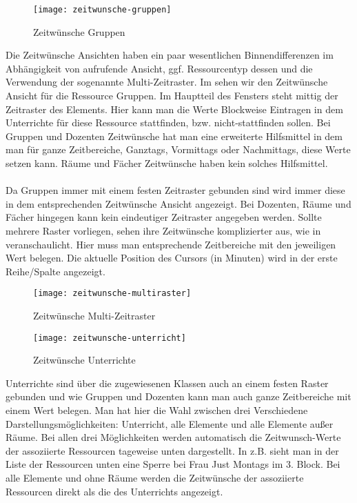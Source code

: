 \newpage

\begin{wrapfigure}{r}{0.3\textwidth}
	\texttt{[image: zeitwunsche-gruppen]}
	\vspace{-15pt}
	\caption{Zeitwünsche Gruppen}
	\label{fig:zeitwunsche-gruppen}
\end{wrapfigure}

\noindent
Die Zeitwünsche Ansichten haben ein paar wesentlichen Binnendifferenzen im Abhängigkeit von aufrufende Ansicht, ggf. Ressourcentyp dessen und die Verwendung der sogenannte Multi-Zeitraster. Im  sehen wir den Zeitwünsche Ansicht für die Ressource Gruppen. Im Hauptteil des Fensters steht mittig der Zeitraster des Elements. Hier kann man die Werte Blockweise Eintragen in dem Unterrichte für diese Ressource stattfinden, bzw. nicht-stattfinden sollen. Bei Gruppen und Dozenten Zeitwünsche hat man eine erweiterte Hilfsmittel in dem man für ganze Zeitbereiche, Ganztags, Vormittags oder Nachmittags, diese Werte setzen kann. Räume und Fächer Zeitwünsche haben kein solches Hilfsmittel.\\
\\
Da Gruppen immer mit einem festen Zeitraster gebunden sind wird immer diese in dem entsprechenden Zeitwünsche Ansicht angezeigt. Bei Dozenten, Räume und Fächer hingegen kann kein eindeutiger Zeitraster angegeben werden. Sollte mehrere Raster vorliegen, sehen ihre Zeitwünsche komplizierter aus, wie in  veranschaulicht. Hier muss man entsprechende Zeitbereiche mit den jeweiligen Wert belegen. Die aktuelle Position des Cursors (in Minuten) wird in der erste Reihe/Spalte angezeigt.

\begin{figure}[h]
	\texttt{[image: zeitwunsche-multiraster]}
	\vspace{-15pt}
	\caption{Zeitwünsche Multi-Zeitraster}
	\label{fig:zeitwunsche-multiraster}
\end{figure}

\begin{wrapfigure}{r}{0.3\textwidth}
	\vspace{-14pt}
	\texttt{[image: zeitwunsche-unterricht]}
	\vspace{-15pt}
	\caption{Zeitwünsche Unterrichte}
	\label{fig:zeitwunsche-unterricht}
\end{wrapfigure}

\noindent
Unterrichte sind über die zugewiesenen Klassen auch an einem festen Raster gebunden und wie Gruppen und Dozenten kann man auch ganze Zeitbereiche mit einem Wert belegen. Man hat hier die Wahl zwischen drei Verschiedene Darstellungsmöglichkeiten: Unterricht, alle Elemente und alle Elemente außer Räume. Bei allen drei Möglichkeiten werden automatisch die Zeitwunsch-Werte der assoziierte Ressourcen tageweise unten dargestellt. In  z.B. sieht man in der Liste der Ressourcen unten eine Sperre bei Frau Just Montags im 3. Block. Bei alle Elemente und ohne Räume werden die Zeitwünsche der assoziierte Ressourcen direkt als die des Unterrichts angezeigt. 

